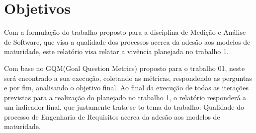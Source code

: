 \chapter{Objetivos}

 Com a formulação do trabalho proposto para a disciplina de Medição e Análise de Software, que visa a qualidade dos processos acerca da adesão aos modelos de maturidade, este relatório visa relatar a vivência planejada no trabalho 1.
        
Com base no GQM(Goal Question Metrics) proposto para o trabalho 01, neste será encontrado a sua execução, coletando as métricas, respondendo as perguntas e por fim, analisando o objetivo final.
Ao final da execução de todas as iterações previstas para a realização do planejado no trabalho 1, o relatório responderá a um indicador final, que justamente trata-se to tema do trabalho: Qualidade do processo de Engenharia de Requisitos acerca da adesão aos modelos de maturidade.
